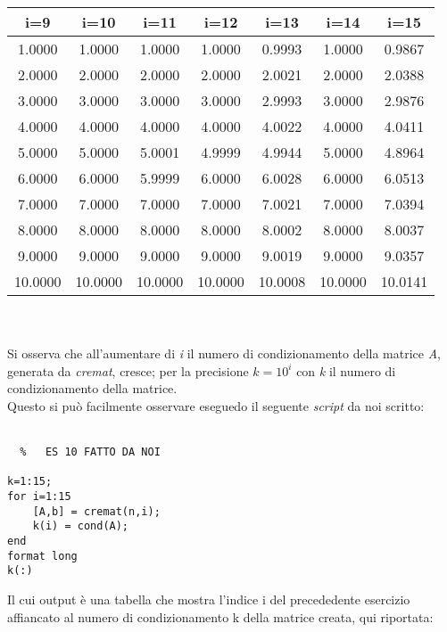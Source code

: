 \documentclass[a4paper]{report}
\begin{document}
\begin{tabular}{|c|c|c|c|c|c|c|}
\hline
i=9&i=10&i=11&i=12&i=13&i=14&i=15\\
\hline 
1.0000& 1.0000& 1.0000& 1.0000& 0.9993& 1.0000& 0.9867\\
\hline
2.0000& 2.0000& 2.0000& 2.0000& 2.0021& 2.0000& 2.0388\\
\hline
3.0000& 3.0000& 3.0000& 3.0000& 2.9993& 3.0000& 2.9876\\
\hline
4.0000& 4.0000& 4.0000& 4.0000& 4.0022& 4.0000& 4.0411\\
\hline
5.0000& 5.0000& 5.0001& 4.9999& 4.9944& 5.0000& 4.8964\\
\hline
6.0000& 6.0000& 5.9999& 6.0000& 6.0028& 6.0000& 6.0513\\
\hline
7.0000& 7.0000& 7.0000& 7.0000& 7.0021& 7.0000& 7.0394\\
\hline 
8.0000& 8.0000& 8.0000& 8.0000& 8.0002& 8.0000& 8.0037\\
\hline
9.0000& 9.0000& 9.0000& 9.0000& 9.0019& 9.0000& 9.0357\\
\hline
10.0000&10.0000&10.0000&10.0000&10.0008&10.0000&10.0141\\
\hline
\end{tabular}
\\\\Si osserva che all'aumentare di \emph{i} il numero di condizionamento della matrice \emph{A}, generata da \emph{cremat}, cresce; per la precisione $k=10^i$ con \emph{k} il numero di condizionamento della matrice.\\
Questo si può facilmente osservare eseguedo il seguente \emph{script} da noi scritto:\\\\
\begin{lstlisting}	%	ES 10 FATTO DA NOI

k=1:15;
for i=1:15
	[A,b] = cremat(n,i);
	k(i) = cond(A);
end
format long
k(:)
\end{lstlisting}
Il cui output è una tabella che mostra l'indice i del precededente esercizio affiancato al numero di condizionamento k della matrice creata, qui riportata:\\\\\\
\end{document}
